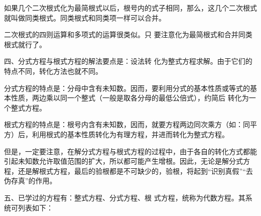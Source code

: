 如果几个二次根式化为最简根式以后，根号内的式子相同，那么，这几个二次根式就叫做同类根式。同类根式和同类项一样可以合并。

二次根式的四则运算和多项式的运算很类似。只
要注意化为最简根式和合并同类根式就行了。

四、分式方程与根式方程的解法要点是：设法转
化为整式方程求解。由于它们的特点不同，转化方法也就不同。

分式方程的特点是：分母中含有未知数。因而，要利用分式的基本性质或等式的基本性质，两边乘以同一个整式（一般是取各分母的最低公倍式），约简后
转化为一个整式方程。

根式方程的特点是：根号内含有未知数，因而，就要方程两边同次乘方（如：同平方）后，利用根式的基本性质转化为有理方程，并进而转化为整式方程。

但是，一定要注意，在解分式方程与根式方程的过程中，由于各自的转化方式都能引起未知数允许取值范围的扩大，所以都可能产生增根。因此，无论是解分式方程，还是解根式方程，最后的验根都是不可缺少的，验根，将起到“识别真假”“去伪存真”的作用。

五、已学过的方程有：整式方程、分式方程、根
式方程，统称为代数方程。其系统可列表如下：
\begin{center}
\end{center}


